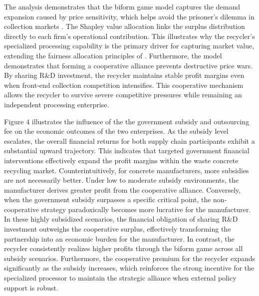 \documentclass[authoryear,preprint,review,times,10pt]{elsarticle}
\begin{document}
The analysis demonstrates that the biform game model captures the demand expansion caused by price sensitivity, which helps avoid the prisoner's dilemma in collection markets \citep{lin2025Cooperation}. The Shapley value allocation links the surplus distribution directly to each firm's operational contribution. This illustrates why the recycler's specialized processing capability is the primary driver for capturing market value, extending the fairness allocation principles of \cite{jia2023Novel}. Furthermore, the model demonstrates that forming a cooperative alliance prevents destructive price wars. By sharing R\&D investment, the recycler maintains stable profit margins even when front-end collection competition intensifies. This cooperative mechanism allows the recycler to survive severe competitive pressures while remaining an independent processing enterprise.

Figure 4 illustrates the influence of the the government subsidy and outsourcing fee on the economic outcomes of the two enterprises. As the subsidy level escalates, the overall financial returns for both supply chain participants exhibit a substantial upward trajectory. This indicates that targeted government financial interventions effectively expand the profit margins within the waste concrete recycling market. Counterintuitively, for concrete manufacturers, more subsidies are not necessarily better. Under low to moderate subsidy environments, the manufacturer derives greater profit from the cooperative alliance. Conversely, when the government subsidy surpasses a specific critical point, the non-cooperative strategy paradoxically becomes more lucrative for the manufacturer. In these highly subsidized scenarios, the financial obligation of sharing R\&D investment outweighs the cooperative surplus, effectively transforming the partnership into an economic burden for the manufacturer. In contrast, the recycler consistently realizes higher profits through the biform game across all subsidy scenarios. Furthermore, the cooperative premium for the recycler expands significantly as the subsidy increases, which reinforces the strong incentive for the specialized processor to maintain the strategic alliance when external policy support is robust.
\end{document}
